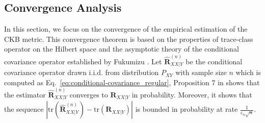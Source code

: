 \documentclass[final]{cvpr}
\newcommand{\MBF}{\mathbf}
\newtheorem{theorem}{Theorem}
\begin{document}
\subsection{Convergence Analysis}

In this section, we focus on the convergence of the empirical estimation of the CKB metric. This convergence theorem is based on the properties of trace-class operator on the Hilbert space and the asymptotic theory of the conditional covariance operator established by Fukumizu \etal \cite{fukumizu2009kernel}. Let $\hat{\MBF{R}}^{(n)}_{XX|Y}$ be the conditional covariance operator drawn i.i.d. from distribution $P_{XY}$ with sample size $n$ which is computed as Eq.~\eqref{eq:conditional-covariance_regular}, Proposition 7 in \cite{fukumizu2009kernel} shows that the estimator $\hat{\MBF{R}}^{(n)}_{XX|Y}$ converges to $\MBF{R}_{XX|Y}$ in probability. Moreover, it shows that the sequence $| \text{tr} (\hat{\MBF{R}}^{(n)}_{XX|Y}) - \text{tr} (\MBF{R}_{XX|Y}) |$ is bounded in probability at rate $\frac{1}{\varepsilon_n \sqrt{n}}$.
\end{document}
